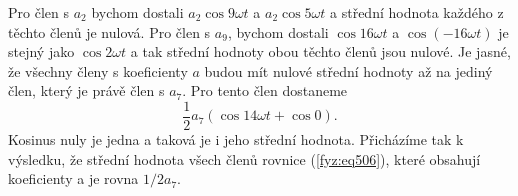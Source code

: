   Pro člen s \(a_2\) bychom dostali \(a_2\cos9\omega t\) a \(a_2\cos5\omega t\) a střední hodnota 
  každého z těchto členů je nulová. Pro člen s \(a_9\), bychom dostali \(\cos16\omega t\) a 
  \(\cos(-16\omega t)\) je stejný jako \(\cos2\omega t\) a tak střední hodnoty obou těchto členů 
  jsou nulové. Je jasné, že všechny členy s koeficienty \(a\) budou mít nulové střední hodnoty až 
  na jediný člen, který je právě člen s \(a_7\). Pro tento člen dostaneme
  \begin{equation}\label{fyz:eq509}
    \frac{1}{2}a_7(\cos 14\omega t + \cos0).
  \end{equation}
  Kosinus nuly je jedna a taková je i jeho střední hodnota. Přicházíme tak k výsledku, že střední 
  hodnota všech členů rovnice (\ref{fyz:eq506}), které obsahují koeficienty a je rovna \(1/2 a_7\).
  
